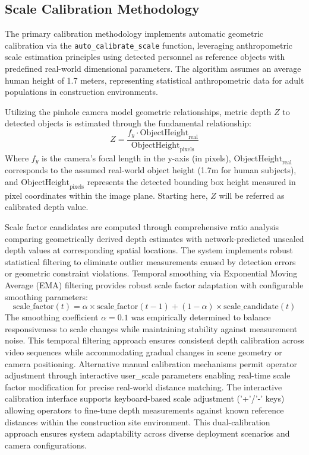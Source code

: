 \documentclass{article}
\begin{document}
\subsection{Scale Calibration Methodology}
The primary calibration methodology implements automatic geometric calibration via the \texttt{auto\_calibrate\_scale} function, leveraging anthropometric scale estimation principles using detected personnel as reference objects with predefined real-world dimensional parameters. The algorithm assumes an average human height of 1.7 meters, representing statistical anthropometric data for adult populations in construction environments.

Utilizing the pinhole camera model geometric relationships, metric depth $Z$ to detected objects is estimated through the fundamental relationship:
\begin{equation}
Z = \frac{f_y \cdot \text{ObjectHeight}_{\text{real}}}{\text{ObjectHeight}_{\text{pixels}}}
\end{equation}
Where $f_y$ is the camera's focal length in the y-axis (in pixels), $\text{ObjectHeight}_{\text{real}}$ corresponds to the assumed real-world object height (1.7m for human subjects), and $\text{ObjectHeight}_{\text{pixels}}$ represents the detected bounding box height measured in pixel coordinates within the image plane. Starting here, $Z$ will be referred as calibrated depth value.

Scale factor candidates are computed through comprehensive ratio analysis comparing geometrically derived depth estimates with network-predicted unscaled depth values at corresponding spatial locations. The system implements robust statistical filtering to eliminate outlier measurements caused by detection errors or geometric constraint violations. Temporal smoothing via Exponential Moving Average (EMA) filtering provides robust scale factor adaptation with configurable smoothing parameters:
\begin{equation}
\text{scale\_factor}(t) = \alpha \times \text{scale\_factor}(t-1) + (1-\alpha) \times \text{scale\_candidate}(t)
\end{equation}
The smoothing coefficient $\alpha=0.1$ was empirically determined to balance responsiveness to scale changes while maintaining stability against measurement noise. This temporal filtering approach ensures consistent depth calibration across video sequences while accommodating gradual changes in scene geometry or camera positioning. Alternative manual calibration mechanisms permit operator adjustment through interactive user\_scale parameters enabling real-time scale factor modification for precise real-world distance matching. The interactive calibration interface supports keyboard-based scale adjustment ('+'/'-' keys) allowing operators to fine-tune depth measurements against known reference distances within the construction site environment. This dual-calibration approach ensures system adaptability across diverse deployment scenarios and camera configurations.
\end{document}
